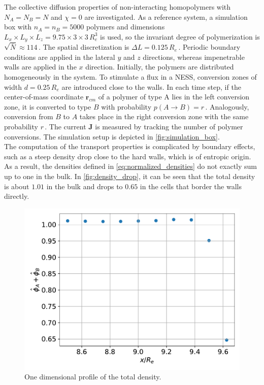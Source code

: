 \documentclass[bachelor,       %
               oneside,        %
               BCOR10mm,       %
               ngerman, english %
               ]{GAUBM}
\begin{document}
The collective diffusion properties of non-interacting homopolymers with $N_A=N_B=N$ and $\chi=0$ are investigated. As a reference system, a simulation box with $n_A=n_B=5000$ polymers and dimensions $L_x\times L_y\times L_z=9.75\times3\times3\,R_e^3$ is used, so the invariant degree of polymerization is $\sqrt{\bar{N}}\approx 114\,$. The spatial discretization is $\Delta L=0.125\,R_e\,$.  Periodic boundary conditions are applied in the lateral $y$ and $z$ directions, whereas impenetrable walls are applied in the $x$ direction. Initially, the polymers are distributed homogeneously in the system. To stimulate a flux in a \ac{NESS}, conversion zones of width $d=0.25\,R_e$ are introduced close to the walls. In each time step, if the center-of-mass coordinate $\mathbf r_{cm}$ of a polymer of type A lies in the left conversion zone, it is converted to type $B$ with probability $p(A\rightarrow B)=r\,$. Analogously, conversion from $B$ to $A$ takes place in the right conversion zone with the same probability $r\,$. The current $\mathbf J$ is measured by tracking the number of polymer conversions. The simulation setup is depicted in \autoref{fig:simulation_box}. \\
The computation of the transport properties is complicated by boundary effects, such as a steep density drop close to the hard walls, which is of entropic origin. As a result, the densities defined in \autoref{eq:normalized_densities} do not exactly sum up to one in the bulk. In \autoref{fig:density_drop}, it can be seen that the total density is about $1.01$ in the bulk and drops to $0.65$ in the cells that border the walls directly.

\begin{figure}[H]
  \centering
  \includegraphics[width=0.6\linewidth]{figures/density_drop.pdf}
  \caption{One dimensional profile of the total density.}
  \label{fig:density_drop}
\end{figure}
\end{document}
